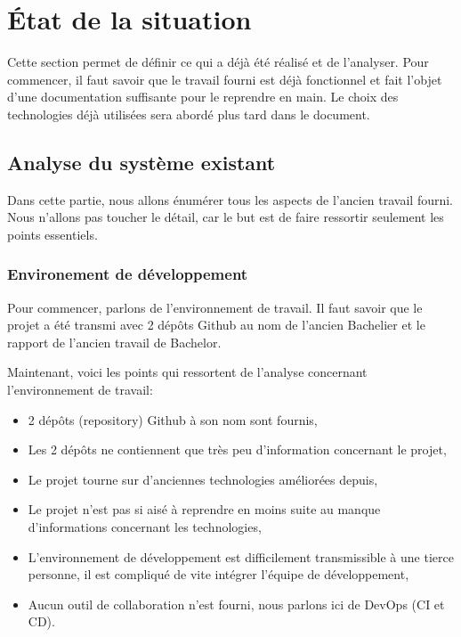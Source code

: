 \documentclass[
    iai, %
    il, %
]{heig-tb}
\begin{document}
\section{État de la situation}
Cette section permet de définir ce qui a déjà été réalisé et de l'analyser. \newline
Pour commencer, il faut savoir que le travail fourni est déjà fonctionnel et fait l'objet d'une documentation suffisante pour le reprendre en main.
Le choix des technologies déjà utilisées sera abordé plus tard dans le document.

\subsection{Analyse du système existant}
Dans cette partie, nous allons énumérer tous les aspects de l'ancien travail fourni. Nous n'allons pas toucher le détail, car le but est de faire ressortir seulement les points essentiels.

\subsubsection{Environement de développement}
Pour commencer, parlons de l'environnement de travail. Il faut savoir que le projet a été transmi avec 2 dépôts Github au nom de l'ancien Bachelier et le rapport de l'ancien travail de Bachelor.

Maintenant, voici les points qui ressortent de l'analyse concernant l'environnement de travail:
\begin{itemize}
    \item 2 dépôts (repository) Github à son nom sont fournis,
    \item Les 2 dépôts ne contiennent que très peu d'information concernant le projet,
    \item Le projet tourne sur d'anciennes technologies améliorées depuis,
    \item Le projet n'est pas si aisé à reprendre en moins suite au manque d'informations concernant les technologies,
    \item L'environnement de développement est difficilement transmissible à une tierce personne, il est compliqué de vite intégrer l'équipe de développement,
    \item Aucun outil de collaboration n'est fourni, nous parlons ici de DevOps (CI et CD).
\end{itemize}
\end{document}
